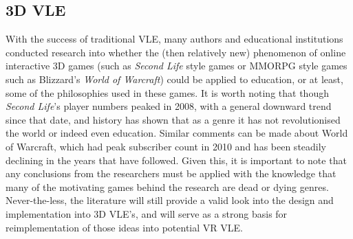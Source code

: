 \documentclass[11pt]{report}
\begin{document}
\subsection{3D VLE}
With the success of traditional VLE, many authors and educational institutions conducted research into whether the (then relatively new) phenomenon of online interactive 3D games (such as \textit{Second Life} style games or MMORPG style games such as Blizzard's \textit{World of Warcraft}) could be applied to education, or at least, some of the philosophies used in these games. It is worth noting that though \textit{Second Life}'s player numbers peaked in 2008, with a general downward trend since that date, and history has shown that as a genre it has not revolutionised the world or indeed even education. Similar comments can be made about World of Warcraft, which had peak subscriber count in 2010 and has been steadily declining in the years that have followed. Given this, it is important to note that any conclusions from the researchers must be applied with the knowledge that many of the motivating games behind the research are dead or dying genres. Never-the-less, the literature will still provide a valid look into the design and implementation into 3D VLE's, and will serve as a strong basis for reimplementation of those ideas into potential VR VLE.\\~\\
\end{document}
